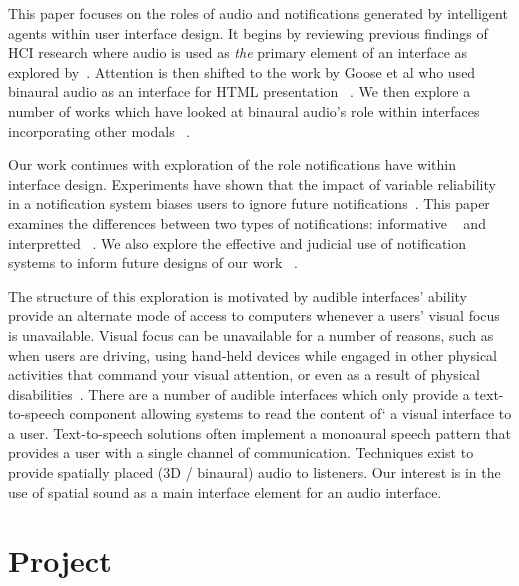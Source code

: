 
This paper focuses on the roles of audio and notifications generated by
intelligent agents within user interface design. It begins by reviewing previous
findings of HCI research where audio is used as \textit{the} primary element of
an interface as explored by~\cite{arons1991hyperspeech}. Attention is then
shifted to the work by Goose et al who used binaural audio as an interface for
HTML presentation ~\cite{goose19993dAudio}. We then explore a number of works
which have looked at binaural audio's role within interfaces incorporating other
modals ~\cite{ yu2006novel, marentakis2004study}.

Our work continues with exploration of the role notifications have within
interface design. Experiments have shown that the impact of variable reliability
in a notification system biases users to ignore future notifications~\cite{
leetiernan2001effective}. This paper examines the  differences between two types
of notifications: informative ~\cite{maltz2000cue} and interpretted
~\cite{horvitz1999principles}.  We also explore the effective and judicial use
of notification systems to  inform future designs of our work
~\cite{cutrell2001notification}.




The structure of this exploration is motivated by audible interfaces' ability
provide an alternate mode of access to computers whenever a users’ visual focus
is unavailable. Visual focus can be unavailable for a number of reasons, such as
when users are driving, using hand-held devices while engaged in other physical
activities that command your visual attention, or even as a result of physical
disabilities~\cite{michelis2008disappearing}. There are a number of audible
interfaces which only provide a text-to-speech component allowing systems to
read the content of` a visual interface to a user.  Text-to-speech solutions
often implement a monoaural speech pattern that provides a user with a single
channel of communication. Techniques exist to provide spatially placed (3D /
binaural) audio to listeners. Our interest is in the use of spatial sound as a
main interface element for an audio interface.


\section{                  Project                                            }

